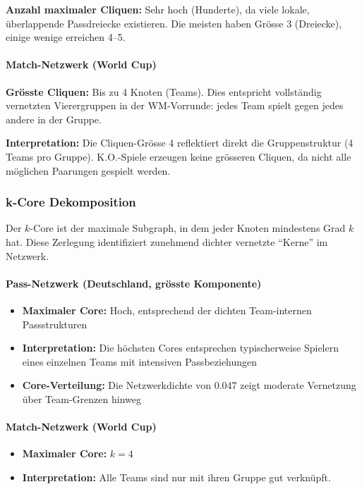 \textbf{Anzahl maximaler Cliquen:} Sehr hoch (Hunderte), da viele lokale, überlappende Passdreiecke existieren. Die meisten haben Grösse 3 (Dreiecke), einige wenige erreichen 4--5.

\paragraph{Match-Netzwerk (World Cup)}
\textbf{Grösste Cliquen:} Bis zu 4 Knoten (Teams). Dies entspricht vollständig vernetzten Vierergruppen in der WM-Vorrunde: jedes Team spielt gegen jedes andere in der Gruppe.

\textbf{Interpretation:} Die Cliquen-Grösse 4 reflektiert direkt die Gruppenstruktur (4 Teams pro Gruppe). K.O.-Spiele erzeugen keine grösseren Cliquen, da nicht alle möglichen Paarungen gespielt werden.

\subsubsection{k-Core Dekomposition}

Der $k$-Core ist der maximale Subgraph, in dem jeder Knoten mindestens Grad $k$ hat. Diese Zerlegung identifiziert zunehmend dichter vernetzte \enquote{Kerne} im Netzwerk.

\paragraph{Pass-Netzwerk (Deutschland, grösste Komponente)}
\begin{itemize}
  \item \textbf{Maximaler Core:} Hoch, entsprechend der dichten Team-internen Passstrukturen
  \item \textbf{Interpretation:} Die höchsten Cores entsprechen typischerweise Spielern eines einzelnen Teams mit intensiven Passbeziehungen
  \item \textbf{Core-Verteilung:} Die Netzwerkdichte von 0.047 zeigt moderate Vernetzung über Team-Grenzen hinweg
\end{itemize}

\paragraph{Match-Netzwerk (World Cup)}
\begin{itemize}
  \item \textbf{Maximaler Core:} $k = 4$
  \item \textbf{Interpretation:} Alle Teams sind nur mit ihren Gruppe gut verknüpft.
\end{itemize}

